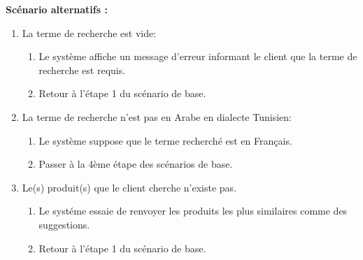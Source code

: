 \newpage
\textbf{Scénario alternatifs : }
\begin{enumerate}
	\item La terme de recherche est vide:
	      \begin{enumerate}
		      \item Le système affiche un message d'erreur informant le client que la terme de recherche est requis.
		      \item Retour à l'étape 1 du scénario de base.
	      \end{enumerate}
	\item La terme de recherche n'est pas en Arabe en dialecte Tunisien:
	      \begin{enumerate}
		      \item Le système suppose que le terme recherché est en Français.
		      \item Passer à la 4ème étape des scénarios de base.
	      \end{enumerate}

	\item Le(s) produit(s) que le client cherche n'existe pas.
	      \begin{enumerate}
		      \item Le systéme essaie de renvoyer les produits les plus similaires comme des suggestions.
		      \item Retour à l'étape 1 du scénario de base.
	      \end{enumerate}
\end{enumerate}